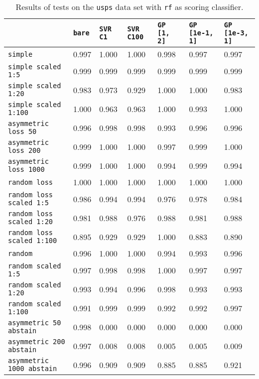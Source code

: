 \begin{table}[H]
{\scriptsize
\begin{tabu}{l|l|l|l|l|l|l}
&\texttt{bare} &\texttt{SVR C1} &\texttt{SVR C100} &\texttt{GP [1, 2]} &\texttt{GP [1e-1, 1]} &\texttt{GP [1e-3, 1]}  \\
\hline
\texttt{simple} &0.997 &1.000 &1.000 &0.998 &0.997 &0.997 \\
\texttt{simple scaled 1:5} &0.999 &0.999 &0.999 &0.999 &0.999 &0.999 \\
\texttt{simple scaled 1:20} &0.983 &0.973 &0.929 &1.000 &1.000 &0.983 \\
\texttt{simple scaled 1:100} &1.000 &0.963 &0.963 &1.000 &0.993 &1.000 \\
\texttt{asymmetric loss 50} &0.996 &0.998 &0.998 &0.993 &0.996 &0.996 \\
\texttt{asymmetric loss 200} &0.999 &1.000 &1.000 &0.997 &0.999 &1.000 \\
\texttt{asymmetric loss 1000} &0.999 &1.000 &1.000 &0.994 &0.999 &0.994 \\
\texttt{random loss} &1.000 &1.000 &1.000 &1.000 &1.000 &1.000 \\
\texttt{random loss scaled 1:5} &0.986 &0.994 &0.994 &0.976 &0.978 &0.984 \\
\texttt{random loss scaled 1:20} &0.981 &0.988 &0.976 &0.988 &0.981 &0.988 \\
\texttt{random loss scaled 1:100} &0.895 &0.929 &0.929 &1.000 &0.883 &0.890 \\
\texttt{random} &0.996 &1.000 &1.000 &0.994 &0.993 &0.996 \\
\texttt{random scaled 1:5} &0.997 &0.998 &0.998 &1.000 &0.997 &0.997 \\
\texttt{random scaled 1:20} &0.993 &0.994 &0.996 &0.998 &0.993 &0.993 \\
\texttt{random scaled 1:100} &0.991 &0.999 &0.999 &0.992 &0.992 &0.997 \\
\texttt{asymmetric 50 abstain} &0.998 &0.000 &0.000 &0.000 &0.000 &0.000 \\
\texttt{asymmetric 200 abstain} &0.997 &0.008 &0.008 &0.005 &0.005 &0.009 \\
\texttt{asymmetric 1000 abstain} &0.996 &0.909 &0.909 &0.885 &0.885 &0.921 \\
\end{tabu} }
\caption{Results of tests on the \texttt{usps} data set
         with \texttt{rf} as scoring classifier.}
\end{table}

